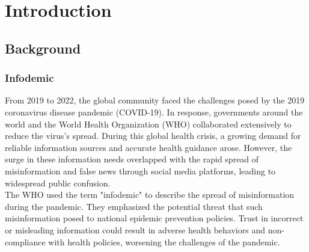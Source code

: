 \chapter{Introduction}
\label{ch:intro}
\section{Background}



\subsection{Infodemic}
From 2019 to 2022, the global community faced the challenges posed by the 2019 coronavirus disease pandemic (COVID-19). In response, governments around the world and the World Health Organization (WHO) collaborated extensively to reduce the virus's spread. During this global health crisis, a growing demand for reliable information sources and accurate health guidance arose. However, the surge in these information needs overlapped with the rapid spread of misinformation and false news through social media platforms, leading to widespread public confusion.\\

The WHO used the term "infodemic"\cite{b1} to describe the spread of misinformation during the pandemic. They emphasized the potential threat that such misinformation posed to national epidemic prevention policies. Trust in incorrect or misleading information could result in adverse health behaviors and non-compliance with health policies, worsening the challenges of the pandemic.
